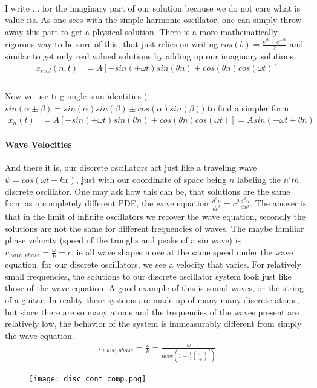 \documentclass{article}
\begin{document}
	\paragraph{}
	I write $...$ for the imaginary part of our solution because we do not care what is value its. As one sees with the simple harmonic oscillator, one can simply throw away this part to get a physical solution. There is a more mathematically rigorous way to be sure of this, that just relies on writing $cos(b) = \frac{e^{ib} + e^{-ib}}{2}$ and similar to get only real valued solutions by adding up our imaginary solutions.
\begin{align}
				x_{real}(n,t) &= A[-sin(\pm \omega t)sin(\theta n) + cos(\theta n)cos(\omega t)]\\
\end{align}
\paragraph{}
Now we use trig angle sum identities ($sin(\alpha \pm \beta) = sin(\alpha)sin(\beta) \pm cos(\alpha)sin(\beta)$) to find a simpler form
\begin{align}
	x_{n}(t) &= A[-sin(\pm \omega t)sin(\theta n) + cos(\theta n)cos(\omega t)] = Asin(\pm \omega t +\theta n)
\end{align}
\paragraph{Wave Velocities}
And there it is, our discrete oscillators act just like a traveling wave $\psi = cos(\omega t - kx)$, just with our coordinate of space being $n$ labeling the $n'th$ discrete oscillator. One may ask how this can be, that solutions are the same form as a completely different PDE, the wave equation $\frac{d^{2}u}{dt^{2}} = c^{2} \frac{d^{2}u}{dx^{2}}$. The answer is that in the limit of infinite oscillators we recover the wave equation, secondly the solutions are not the same for different frequencies of waves. The maybe familiar phase velocity (speed of the troughs and peaks of a sin wave) is $v_{wave, phase} =\frac{\omega}{k} = c$, ie all wave shapes move at the same speed under the wave equation. for our discrete oscillators, we see a velocity that varies. For relatively small frequencies, the solutions to our discrete oscillator system look just like those of the wave equation. A good example of this is sound waves, or the string of a guitar. In reality these systems are made up of many many discrete atoms, but since there are so many atoms and the frequencies of the waves present are relatively low, the behavior of the system is immeasurably different from simply the wave equation.
\begin{align}
	v_{wave, phase} = \frac{\omega}{k} = \frac{\omega}{acos(1-\frac{1}{2}(\frac{\omega}{\omega_{0}})^{2})}
\end{align}
	\begin{figure}[H]
	\texttt{[image: disc\_cont\_comp.png]}
\end{figure}
\end{document}
